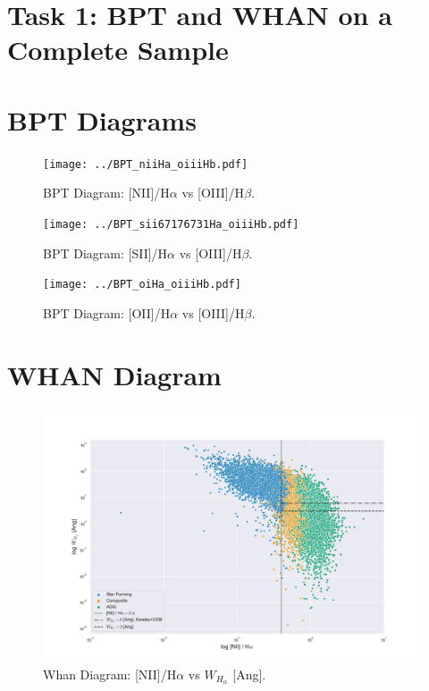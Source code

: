 \documentclass[letterpaper, oneside]{article}
\begin{document}
	
\templatePagecfg


\section*{Task 1: BPT and WHAN on a Complete Sample}



\section{BPT Diagrams}

\begin{figure}[H]
	\centering
	\texttt{[image: ../BPT\_niiHa\_oiiiHb.pdf]}
	\caption{BPT Diagram: [NII]/H$\alpha$ vs [OIII]/H$\beta$.}
	\label{fig:BPT_niiHa_oiiiHb}
\end{figure}

\begin{figure}[H]
	\centering
	\texttt{[image: ../BPT\_sii67176731Ha\_oiiiHb.pdf]}
	\caption{BPT Diagram: [SII]/H$\alpha$ vs [OIII]/H$\beta$.}
	\label{fig:BPT_siiHa_oiiiHb}
\end{figure}

\begin{figure}[H]
	\centering
	\texttt{[image: ../BPT\_oiHa\_oiiiHb.pdf]}
	\caption{BPT Diagram: [OII]/H$\alpha$ vs [OIII]/H$\beta$.}
	\label{fig:BPT_oiHa_oiiiHb}
\end{figure}

\section{WHAN Diagram}

\begin{figure}[H]
	\centering
	\includegraphics[width=1.1\textwidth]{../WHAN_diagram.pdf}
	\caption{Whan Diagram: [NII]/H$\alpha$ vs $W_{H_{\alpha}}$ [Ang].}
	\label{fig:WHAN}
\end{figure}
\end{document}
